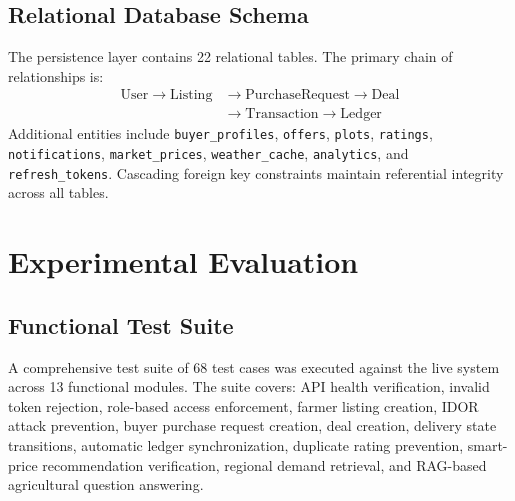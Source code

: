 \documentclass[conference]{IEEEtran}
\begin{document}
\subsection{Relational Database Schema}

The persistence layer contains 22 relational tables. The primary
chain of relationships is:
\begin{equation}
\begin{split}
\mathrm{User}
\rightarrow \mathrm{Listing}
&\rightarrow \mathrm{PurchaseRequest}
\rightarrow \mathrm{Deal}\\
&\rightarrow \mathrm{Transaction}
\rightarrow \mathrm{Ledger}
\end{split}
\end{equation}
Additional entities include \texttt{buyer\_profiles},
\texttt{offers}, \texttt{plots}, \texttt{ratings},
\texttt{notifications}, \texttt{market\_prices},
\texttt{weather\_cache}, \texttt{analytics}, and
\texttt{refresh\_tokens}. Cascading foreign key constraints
maintain referential integrity across all tables.

\section{Experimental Evaluation}

\subsection{Functional Test Suite}

A comprehensive test suite of 68 test cases was executed against
the live system across 13 functional modules. The suite covers:
API health verification, invalid token rejection, role-based access
enforcement, farmer listing creation, IDOR attack prevention,
buyer purchase request creation, deal creation, delivery state
transitions, automatic ledger synchronization, duplicate rating
prevention, smart-price recommendation verification, regional
demand retrieval, and RAG-based agricultural question answering.
\end{document}
